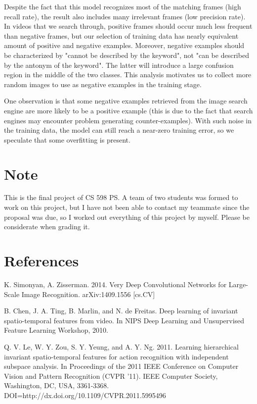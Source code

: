 \documentclass{article}
\begin{document}
Despite the fact that this model recognizes most of the matching frames (high recall rate), the result also includes many irrelevant frames (low precision rate). In videos that we search through, positive frames should occur much less frequent than negative frames, but our selection of training data has nearly equivalent amount of positive and negative examples. Moreover, negative examples should be characterized by "cannot be described by the keyword", not "can be described by the antonym of the keyword". The latter will introduce a large confusion region in the middle of the two classes. This analysis motivates us to collect more random images to use as negative examples in the training stage. 

One observation is that some negative examples retrieved from the image search engine are more likely to be a positive example (this is due to the fact that search engines may encounter problem generating counter-examples). With such noise in the training data, the model can still reach a near-zero training error, so we speculate that some overfitting is present. 


\section{Note}

This is the final project of CS 598 PS. A team of two students was formed to work on this project, but I have not been able to contact my teammate since the proposal was due, so I worked out everything of this project by myself. Please be considerate when grading it. 

\section{References}

K. Simonyan, A. Zisserman. 2014. Very Deep Convolutional Networks for Large-Scale Image Recognition. arXiv:1409.1556 [cs.CV]

B. Chen, J. A. Ting, B. Marlin, and N. de Freitas. Deep learning of invariant spatio-temporal features from video. In NIPS Deep Learning and Unsupervised Feature Learning Workshop, 2010.

Q. V. Le, W. Y. Zou, S. Y. Yeung, and A. Y. Ng. 2011. Learning hierarchical invariant spatio-temporal features for action recognition with independent subspace analysis. In Proceedings of the 2011 IEEE Conference on Computer Vision and Pattern Recognition (CVPR '11). IEEE Computer Society, Washington, DC, USA, 3361-3368. DOI=http://dx.doi.org/10.1109/CVPR.2011.5995496
\end{document}
